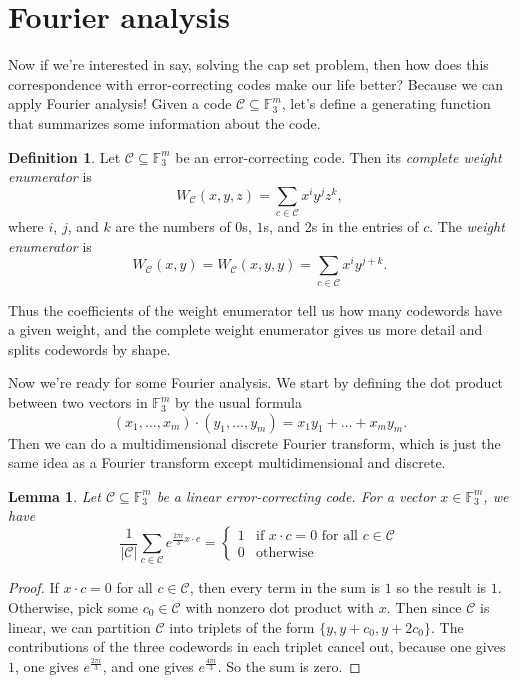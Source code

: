 \documentclass{article}
\newtheorem{lem}[thm]{Lemma}
\theoremstyle{definition}
\newtheorem{defn}[thm]{Definition}
\theoremstyle{remark}
\begin{document}
\section{Fourier analysis}
Now if we're interested in say, solving the cap set problem, then how does this correspondence with error-correcting codes make our life better? Because we can apply Fourier analysis! Given a code $\mathcal C\subseteq\mathbb F_3^m$, let's define a generating function that summarizes some information about the code.

\begin{defn}
    Let $\mathcal C\subseteq\mathbb F_3^m$ be an error-correcting code. Then its \emph{complete weight enumerator} is
    \[W_{\mathcal C}(x,y,z)=\sum_{c\in\mathcal C}x^iy^jz^k,\]
    where $i$, $j$, and $k$ are the numbers of $0$s, $1$s, and $2$s in the entries of $c$. The \emph{weight enumerator} is
    \[W_{\mathcal C}(x,y)=W_{\mathcal C}(x,y,y)=\sum_{c\in\mathcal C}x^iy^{j+k}.\]
\end{defn}

Thus the coefficients of the weight enumerator tell us how many codewords have a given weight, and the complete weight enumerator gives us more detail and splits codewords by shape.

Now we're ready for some Fourier analysis. We start by defining the dot product between two vectors in $\mathbb F_3^m$ by the usual formula
\[(x_1,\dots,x_m)\cdot(y_1,\dots,y_m)=x_1y_1+\dots+x_my_m.\] 
Then we can do a multidimensional discrete Fourier transform, which is just the same idea as a Fourier transform except multidimensional and discrete.

\begin{lem}
    Let $\mathcal C\subseteq\mathbb F_3^m$ be a linear error-correcting code. For a vector $x\in\mathbb F_3^m$, we have
    \[\frac1{ |\mathcal C| }\sum_{c\in\mathcal C}e^{\frac{2\pi i}3 x\cdot c}=\begin{cases}
    1&\text{if }x\cdot c=0\text{ for all }c\in\mathcal C\\
    0&\text{otherwise}
    \end{cases}\]
\end{lem}
\begin{proof}
    If $x\cdot c=0$ for all $c\in\mathcal C$, then every term in the sum is $1$ so the result is $1$. Otherwise, pick some $c_0\in\mathcal C$ with nonzero dot product with $x$. Then since $\mathcal C$ is linear, we can partition $\mathcal C$ into triplets of the form $\{y,y+c_0,y+2c_0\}$. The contributions of the three codewords in each triplet cancel out, because one gives $1$, one gives $e^{\frac{2\pi i}3}$, and one gives $e^{\frac{4\pi i}3}$. So the sum is zero.
\end{proof}
\end{document}
